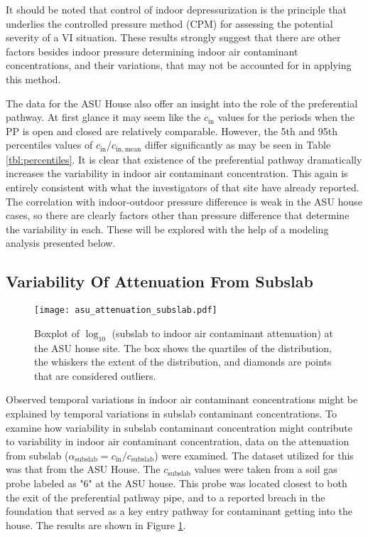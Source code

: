 \documentclass[journal=esthag,manuscript=article]{achemso}
\begin{document}
It should be noted that control of indoor depressurization is the principle that underlies the controlled pressure method (CPM) for assessing the potential severity of a VI situation.
These results strongly suggest that there are other factors besides indoor pressure determining indoor air contaminant concentrations, and their variations, that may not be accounted for in applying this method.\par

The data for the ASU House also offer an insight into the role of the preferential pathway.
At first glance it may seem like the $c_\mathrm{in}$ values for the periods when the PP is open and closed are relatively comparable.
However, the 5th and 95th percentiles values of $c_\mathrm{in}$/$c_\mathrm{in,mean}$ differ significantly as may be seen in Table \ref{tbl:percentiles}.
It is clear that existence of the preferential pathway dramatically increases the variability in indoor air contaminant concentration.
This again is entirely consistent with what the investigators of that site have already reported\cite{guo_identification_2015}.
The correlation with indoor-outdoor pressure difference is weak in the ASU house cases, so there are clearly factors other than pressure difference that determine the variability in each.
These will be explored with the help of a modeling analysis presented below.\par

\subsection{Variability Of Attenuation From Subslab}

\begin{figure}[htb!]
 \caption{Boxplot of $\log_{10}$ (subslab to indoor air contaminant attenuation) at the ASU house site. The box shows the quartiles of the distribution, the whiskers the extent of the distribution, and diamonds are points that are considered outliers.}\label{fig:attenuation_subslab}
 \texttt{[image: asu\_attenuation\_subslab.pdf]}
\end{figure}

Observed temporal variations in indoor air contaminant concentrations might be explained by temporal variations in subslab contaminant concentrations.
To examine how variability in subslab contaminant concentration might contribute to variability in indoor air contaminant concentration, data on the attenuation from subslab ($\alpha_\mathrm{subslab} = c_\mathrm{in}/c_\mathrm{subslab}$) were examined.
The dataset utilized for this was that from the ASU House.
The $c_\mathrm{subslab}$ values were taken from a soil gas probe labeled as "6" at the ASU house.
This probe was located closest to both the exit of the preferential pathway pipe, and to a reported breach in the foundation that served as a key entry pathway for contaminant getting into the house\cite{guo_identification_2015}.
The results are shown in Figure \ref{fig:attenuation_subslab}.\par
\end{document}
